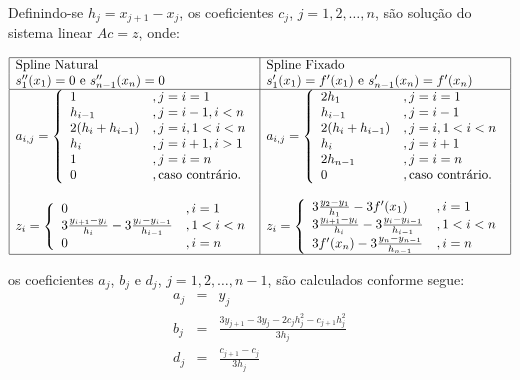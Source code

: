 Definindo-se $h_j = x_{j+1} - x_j$, os coeficientes $c_j$, $j=1,2,\dotsc,n$, são solução do sistema linear $Ac = z$, onde:
\begin{small}
  \begin{equation*}
  \begin{array}{|l|l|}\hline
    \text{Spline Natural} & \text{Spline Fixado}\\
    s_1''(x_1) = 0 \text{ e } s_{n-1}''(x_n) = 0 & s_1'(x_1) = f'(x_1) \text{ e } s_{n-1}'(x_n) = f'(x_n)\\ \hline
    a_{i,j} = \left\{
      \begin{array}{ll}
        1 &, j=i=1\\
        h_{i-1} &, j = i-1, i<n\\
        2(h_i + h_{i-1}) &, j=i, 1<i<n\\
        h_i &, j=i+1, i>1\\
        1 &, j=i=n\\
        0 &, \text{caso contrário.}
      \end{array}
\right. &  a_{i,j} = \left\{
      \begin{array}{ll}
        2h_1 &, j=i=1\\
        h_{i-1} &, j = i-1\\
        2(h_i + h_{i-1}) &, j=i, 1<i<n\\
        h_i &, j=i+1\\
        2h_{n-1} &, j=i=n\\
        0 &, \text{caso contrário.}
      \end{array}
\right.\\
&\\
z_i = \left\{
  \begin{array}{ll}
    0 &, i=1\\
    3\frac{y_{i+1}-y_i}{h_i} - 3\frac{y_i-y_{i-1}}{h_{i-1}} &, 1<i<n\\
    0 &, i=n
  \end{array}
\right. & z_i = \left\{
  \begin{array}{ll}
    3\frac{y_2-y_1}{h_1} - 3f'(x_1) &, i=1\\
    3\frac{y_{i+1}-y_i}{h_i} - 3\frac{y_i-y_{i-1}}{h_{i-1}} &, 1<i<n\\
    3f'(x_n) - 3\frac{y_n - y_{n-1}}{h_{n-1}} &, i=n
  \end{array}
\right. \\ \hline
  \end{array}
\end{equation*}
\end{small}
os coeficientes $a_j$, $b_j$ e $d_j$, $j=1,2,\dotsc,n-1$, são calculados conforme segue:
\begin{eqnarray*}
  a_j &=& y_j\\
  b_j &=& \frac{3y_{j+1} - 3y_j - 2c_jh_j^2 - c_{j+1}h_j^2}{3h_j}\\
  d_j &=& \frac{c_{j+1} - c_j}{3h_j}
\end{eqnarray*}

% 